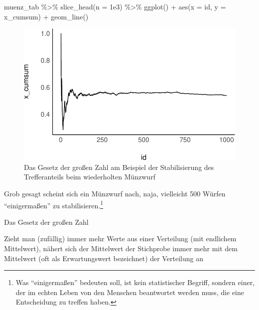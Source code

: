 \documentclass[
  a4paper,
  DIV=11]{scrreprt}
\newenvironment{Shaded}{\begin{snugshade}}{\end{snugshade}}
\newcommand{\AttributeTok}[1]{\textcolor[rgb]{0.40,0.45,0.13}{#1}}
\newcommand{\FloatTok}[1]{\textcolor[rgb]{0.68,0.00,0.00}{#1}}
\newcommand{\FunctionTok}[1]{\textcolor[rgb]{0.28,0.35,0.67}{#1}}
\newcommand{\NormalTok}[1]{\textcolor[rgb]{0.00,0.23,0.31}{#1}}
\newcommand{\SpecialCharTok}[1]{\textcolor[rgb]{0.37,0.37,0.37}{#1}}
\theoremstyle{definition}
\theoremstyle{remark}
\begin{document}
\begin{Shaded}
\begin{Highlighting}[]
\NormalTok{muenz\_tab }\SpecialCharTok{\%\textgreater{}\%} 
  \FunctionTok{slice\_head}\NormalTok{(}\AttributeTok{n =} \FloatTok{1e3}\NormalTok{) }\SpecialCharTok{\%\textgreater{}\%} 
  \FunctionTok{ggplot}\NormalTok{() }\SpecialCharTok{+}
  \FunctionTok{aes}\NormalTok{(}\AttributeTok{x =}\NormalTok{ id, }\AttributeTok{y =}\NormalTok{ x\_cumsum) }\SpecialCharTok{+}
  \FunctionTok{geom\_line}\NormalTok{()}
\end{Highlighting}
\end{Shaded}

\begin{figure}[H]

{\centering \includegraphics{./Verteilungen_files/figure-pdf/fig-lln-1.pdf}

}

\caption{\label{fig-lln}Das Gesetz der großen Zahl am Beispiel der
Stabilisierung des Trefferanteils beim wiederholten Münzwurf}

\end{figure}

Grob gesagt scheint sich ein Münzwurf nach, naja, vielleicht 500 Würfen
``einigermaßen'' zu stabilisieren.\footnote{Was ``einigermaßen''
  bedeuten soll, ist kein statistischer Begriff, sondern einer, der im
  echten Leben von den Menschen beantwortet werden muss, die eine
  Entscheidung zu treffen haben.}

\begin{tcolorbox}[enhanced jigsaw, leftrule=.75mm, toptitle=1mm, bottomtitle=1mm, titlerule=0mm, breakable, colframe=quarto-callout-important-color-frame, title=\textcolor{quarto-callout-important-color}{\faExclamation}\hspace{0.5em}{Wichtig}, rightrule=.15mm, colback=white, arc=.35mm, left=2mm, bottomrule=.15mm, coltitle=black, opacitybacktitle=0.6, toprule=.15mm, colbacktitle=quarto-callout-important-color!10!white, opacityback=0]
Das Gesetz der großen Zahl

Zieht man (zufällig) immer mehr Werte aus einer Verteilung (mit
endlichem Mittelwert), nähert sich der Mittelwert der Stichprobe immer
mehr mit dem Mittelwert (oft als Erwartungswert bezeichnet) der
Verteilung an
\end{tcolorbox}
\end{document}
